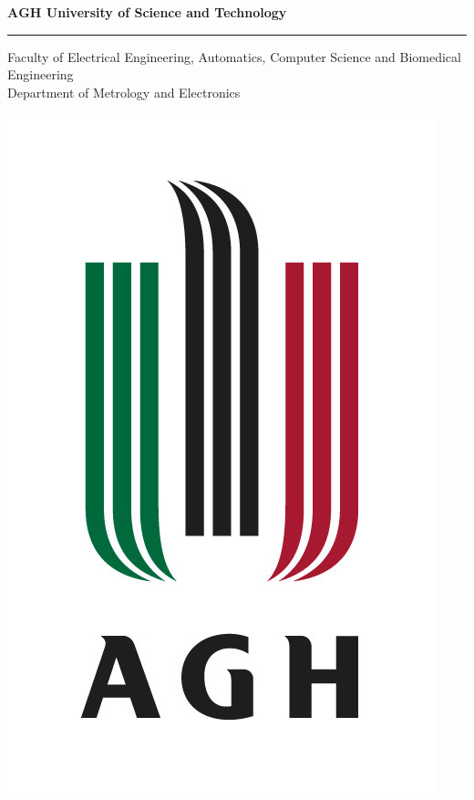 \begin{titlepage}
\begin{center}

{\Large{\bfseries{\textsc AGH University of Science and Technology}}}

\vspace*{1mm}\rule{.9\textwidth}{1mm}\vspace*{1mm}

{\large Faculty of Electrical Engineering, Automatics, Computer Science and Biomedical Engineering\\[2mm] Department of Metrology and Electronics}
\vspace*{0.5cm}

\includegraphics[scale=0.7]{images/agh_logo.jpg}\\


\end{center}
\end{titlepage}
